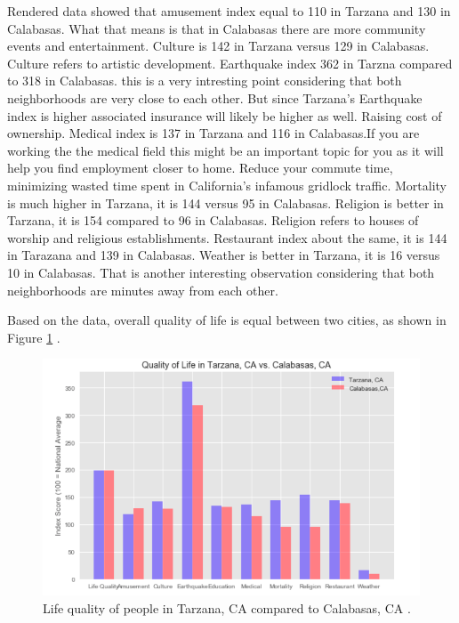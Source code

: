 \documentclass[sigconf]{acmart}
\begin{document}
Rendered data showed that amusement index equal to 110 in Tarzana and 130 in Calabasas. What that means is that in Calabasas there are more community events and entertainment. Culture is 142 in Tarzana versus 129 in Calabasas. Culture refers to artistic development. Earthquake index 362 in Tarzna compared to 318 in Calabasas. this is a very intresting point considering that both neighborhoods are very close to each other. But since Tarzana's Earthquake index is higher associated insurance will likely be higher as well.  Raising cost of ownership. Medical index is 137 in Tarzana and 116 in Calabasas.If you are working the the medical field this might be an important topic for you as it will help you find employment closer to home. Reduce your commute time, minimizing wasted time spent in California's infamous gridlock traffic. Mortality is much higher in Tarzana, it is 144 versus 95 in Calabasas. Religion is better in Tarzana, it is 154 compared to 96 in Calabasas. Religion refers to houses of worship and religious establishments. Restaurant index about the same, it is 144 in Tarazana and 139 in Calabasas. Weather is better in Tarzana, it is 16 versus 10 in Calabasas. That is another interesting observation considering that both neighborhoods are minutes away from each other.

Based on the data, overall quality of life is equal between two cities, as shown in Figure \ref{fig:figure3} \cite{md}.

\begin{figure}
  \centering
  \includegraphics[width=1.0\columnwidth]{images/figure3.png}
  \caption{Life quality of people in Tarzana, CA compared to Calabasas, CA  \cite{md}.} \label{fig:figure3} 
\end{figure}
\end{document}
